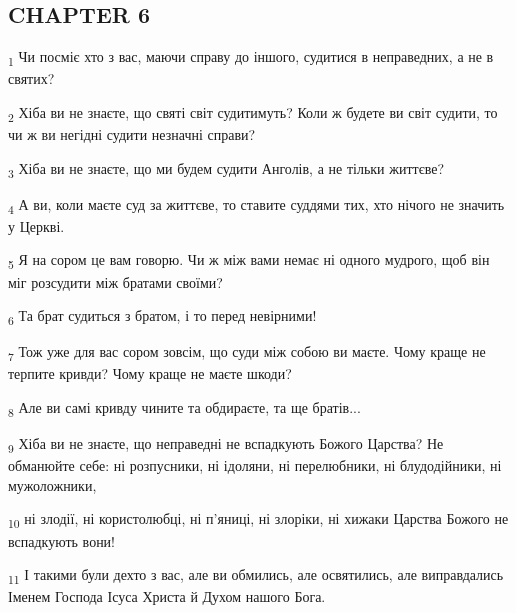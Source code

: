 \subsection{CHAPTER 6}
\begin{tcolorbox}
\textsubscript{1} Чи посміє хто з вас, маючи справу до іншого, судитися в неправедних, а не в святих?
\end{tcolorbox}
\begin{tcolorbox}
\textsubscript{2} Хіба ви не знаєте, що святі світ судитимуть? Коли ж будете ви світ судити, то чи ж ви негідні судити незначні справи?
\end{tcolorbox}
\begin{tcolorbox}
\textsubscript{3} Хіба ви не знаєте, що ми будем судити Анголів, а не тільки життєве?
\end{tcolorbox}
\begin{tcolorbox}
\textsubscript{4} А ви, коли маєте суд за життєве, то ставите суддями тих, хто нічого не значить у Церкві.
\end{tcolorbox}
\begin{tcolorbox}
\textsubscript{5} Я на сором це вам говорю. Чи ж між вами немає ні одного мудрого, щоб він міг розсудити між братами своїми?
\end{tcolorbox}
\begin{tcolorbox}
\textsubscript{6} Та брат судиться з братом, і то перед невірними!
\end{tcolorbox}
\begin{tcolorbox}
\textsubscript{7} Тож уже для вас сором зовсім, що суди між собою ви маєте. Чому краще не терпите кривди? Чому краще не маєте шкоди?
\end{tcolorbox}
\begin{tcolorbox}
\textsubscript{8} Але ви самі кривду чините та обдираєте, та ще братів...
\end{tcolorbox}
\begin{tcolorbox}
\textsubscript{9} Хіба ви не знаєте, що неправедні не вспадкують Божого Царства? Не обманюйте себе: ні розпусники, ні ідоляни, ні перелюбники, ні блудодійники, ні мужоложники,
\end{tcolorbox}
\begin{tcolorbox}
\textsubscript{10} ні злодії, ні користолюбці, ні п'яниці, ні злоріки, ні хижаки Царства Божого не вспадкують вони!
\end{tcolorbox}
\begin{tcolorbox}
\textsubscript{11} І такими були дехто з вас, але ви обмились, але освятились, але виправдались Іменем Господа Ісуса Христа й Духом нашого Бога.
\end{tcolorbox}
